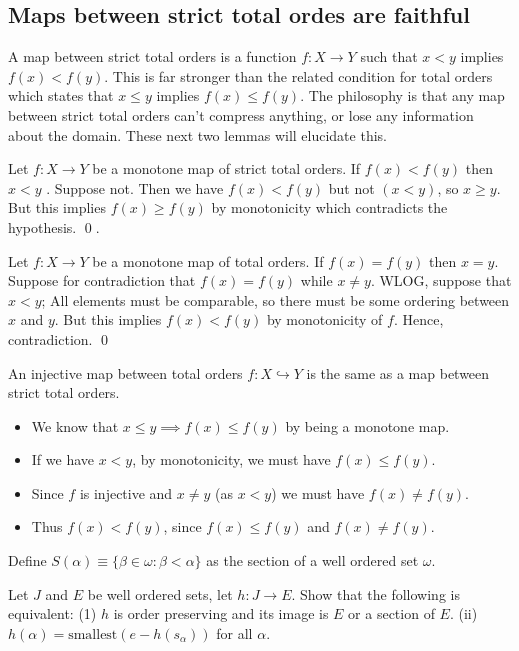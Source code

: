 \documentclass{article}
\begin{document}
\subsection{Maps between strict total ordes are faithful}

 A map between strict total orders is a function $f: X \rightarrow Y$
such that $x < y$ implies $f(x) < f(y)$. This is far stronger than the related condition for total orders
which states that $x \leq y$ implies $f(x) \leq f(y)$.  The philosophy is that
any map between strict total orders can't compress anything, or lose any
information about the domain. These next two lemmas will elucidate this.

 Let $f: X \rightarrow Y$ be a monotone map of strict total orders. If $f(x) < f(y)$ then $x < y$
. Suppose not. Then we have $f(x) < f(y)$ but not $(x < y)$, so $x \geq y$. But this implies  $f(x) \geq f(y)$
by monotonicity which contradicts the hypothesis. \qed.

 Let $f: X \rightarrow Y$ be a monotone map of total orders. If $f(x) = f(y)$ then $x = y$.
 Suppose for contradiction that $f(x) = f(y)$ while $x \neq y$.
WLOG, suppose that $x < y$; All elements must be comparable, so there must be some ordering between $x$ and $y$.
But this implies $f(x) < f(y)$ by monotonicity of $f$. Hence, contradiction. \qed


 An injective map between total orders $f: X \hookrightarrow Y$ is the same as a map
between strict total orders.
\begin{itemize}
    \item We know that $x \leq y \implies f(x) \leq f(y)$ by being a monotone map.
    \item If we have $x < y$, by monotonicity, we must have $f(x) \leq f(y)$.
    \item Since $f$ is injective and $x \neq y$ (as $x < y$) we must have $f(x) \neq f(y)$.
    \item Thus $f(x) < f(y)$, since $f(x) \leq f(y)$ and $f(x) \neq f(y)$.
\end{itemize}

 Define $S(\alpha) \equiv \{ \beta \in \omega : \beta < \alpha \}$ as the section of a well ordered set $\omega$.

 Let $J$ and $E$ be well ordered sets, let $h: J \rightarrow E$. Show that the following is equivalent: (1) $h$ is order preserving and its image is $E$ or
a section of $E$. (ii) $h(\alpha) = \text{smallest}(e - h(s_\alpha))$ for all $\alpha$.
\end{document}
